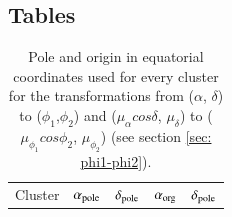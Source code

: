 \documentclass{aa}
\begin{document}
\begin{appendix}
\subsection{Tables}



\begin{table}[h]
\label{Table: phi_org_pole}
\caption{Pole and origin in equatorial coordinates used for every cluster for the transformations from ($\alpha$, $\delta$) to ($\phi_1$,$\phi_2$) and ($\mu_{\alpha} cos \delta $, $\mu_{\delta}$) to ($\mu_{\phi_{1}} cos \phi_2 $, $\mu_{\phi_{2}}$) (see section \ref{sec: phi1-phi2}).} 
\centering
\begin{tabular}{c c c c c}

\hline
Cluster  &$\alpha_{\rm{pole}}$   & $\delta_{\rm{pole}}$ & $\alpha_{\rm{org}}$ & $\delta_{\rm{pole}}$ \\


\end{tabular}
\end{table}
\end{appendix}
\end{document}
